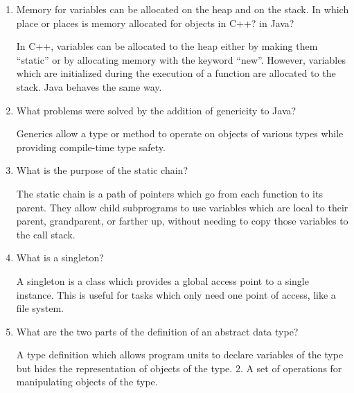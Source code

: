 \begin{enumerate}
\begin{answer}
\end{answer}

  \item Memory for variables can be allocated on the heap
    and on the stack. In which place or places is memory
    allocated for objects in C++? in Java?
    
\begin{answer}

    In C++, variables can be allocated to the heap either by making
    them “static” or by allocating memory with the keyword
    “new”. However, variables which are initialized during the
    execution of a function are allocated to the stack. Java behaves
    the same way.
    
\end{answer}

  \item What problems were solved by the addition
    of genericity to Java?
    
\begin{answer}

    Generics allow a type or method to operate on objects of various
    types while providing compile-time type safety.
    
\end{answer}

  \item What is the purpose of the static chain?
  
\begin{answer}

  The static chain is a path of pointers which go from each function
  to its parent. They allow child subprograms to use variables which
  are local to their parent, grandparent, or farther up, without
  needing to copy those variables to the call stack.
  
\end{answer}

  \item What is a singleton?
  
\begin{answer}

  A singleton is a class which provides a global access point to a
  single instance. This is useful for tasks which only need one point
  of access, like a file system.
  
\end{answer}

  \item What are the two parts of the definition 
    of an abstract data type?
    
\begin{answer}

A type definition which allows program units to declare variables of
the type but hides the representation of objects of the type. 2. A set
of operations for manipulating objects of the type.

\end{answer}

  \end{enumerate}


